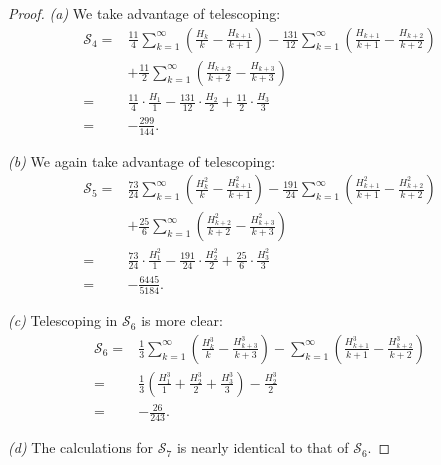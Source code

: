 \documentclass[10pt]{amsart}
\theoremstyle{definition}
\begin{document}
\begin{proof}
    \textit{(a)} We take advantage of telescoping:
    \begin{align*}
        \mathcal{S}_4
        =& \frac{11}{4}\sum_{k=1}^\infty \left(\frac{H_k}{k} - \frac{H_{k+1}}{k+1}\right) - \frac{131}{12}\sum_{k=1}^\infty \left( \frac{H_{k+1}}{k+1} -  \frac{H_{k+2}}{k+2}\right) \\
        &+ \frac{11}{2}\sum_{k=1}^\infty \left(\frac{H_{k+2}}{k+2} - \frac{H_{k+3}}{k+3}\right)\\
        =& \frac{11}{4} \cdot \frac{H_1}{1} - \frac{131}{12} \cdot \frac{H_2}{2} + \frac{11}{2} \cdot \frac{H_3}{3}\\
        =& -\frac{299}{144}.
    \end{align*}

    \noindent
    \textit{(b)} We again take advantage of telescoping:
    \begin{align*}
        \mathcal{S}_5
        =& \frac{73}{24}\sum_{k=1}^\infty \left(\frac{H_k^2}{k} - \frac{H_{k+1}^2}{k+1}\right) - \frac{191}{24}\sum_{k=1}^\infty \left(\frac{H_{k+1}^2}{k+1} - \frac{H_{k+2}^2}{k+2}\right) \\
        &+ \frac{25}{6}\sum_{k=1}^\infty \left(\frac{H_{k+2}^2}{k+2} - \frac{H_{k+3}^2}{k+3}\right)\\
        =& \frac{73}{24} \cdot \frac{H_1^2}{1} - \frac{191}{24} \cdot \frac{H_2^2}{2} + \frac{25}{6} \cdot \frac{H_3^2}{3}\\
        =& -\frac{6445}{5184}.
    \end{align*}

    \noindent
    \textit{(c)} Telescoping in $\mathcal{S}_6$ is more clear:
    \begin{align*}
        \mathcal{S}_6
        =& \frac{1}{3}\sum_{k=1}^\infty \left(\frac{H_k^3}{k} - \frac{H_{k+3}^3}{k+3}\right) - \sum_{k=1}^\infty \left(\frac{H_{k+1}^3}{k+1} - \frac{H_{k+2}^3}{k+2}\right)\\
        =& \frac{1}{3}\left(\frac{H_1^3}{1}+\frac{H_2^3}{2}+\frac{H_3^3}{3}\right) - \frac{H_2^3}{2}\\
        =& -\frac{26}{243}.
    \end{align*}

    \noindent
    \textit{(d)} The calculations for $\mathcal{S}_7$ is nearly identical to that of $\mathcal{S}_6$.
\end{proof}
\end{document}

